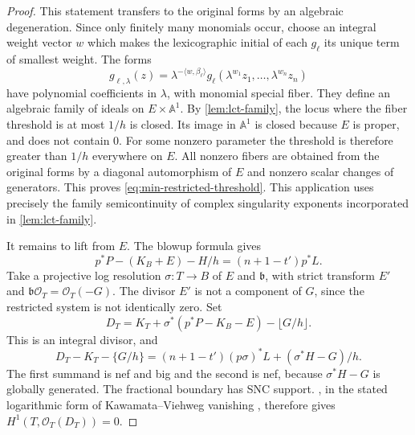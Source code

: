 \begin{proof}
This statement transfers to the original forms by an algebraic degeneration. Since only finitely many monomials occur, choose an integral weight vector $w$ which makes the lexicographic initial of each $g_\ell$ its unique term of smallest weight. The forms
\[
 g_{\ell,\lambda}(z)
   =\lambda^{-\langle w,\beta_\ell\rangle}
      g_\ell(\lambda^{w_1}z_1,\ldots,\lambda^{w_n}z_n)
\]
have polynomial coefficients in $\lambda$, with monomial special fiber. They define an algebraic family of ideals on $E\times\mathbb{A}^1$. By \cref{lem:lct-family}, the locus where the fiber threshold is at most $1/h$ is closed. Its image in $\mathbb{A}^1$ is closed because $E$ is proper, and does not contain $0$. For some nonzero parameter the threshold is therefore greater than $1/h$ everywhere on $E$. All nonzero fibers are obtained from the original forms by a diagonal automorphism of $E$ and nonzero scalar changes of generators. This proves \eqref{eq:min-restricted-threshold}. This application uses precisely the family semicontinuity of complex singularity exponents \cite{dk2001} incorporated in \cref{lem:lct-family}.

It remains to lift from $E$. The blowup formula gives
\begin{equation}
\label{eq:min-adjoint-identity}
 p^*P-(K_B+E)-H/h=(n+1-t')p^*L.
\end{equation}
Take a projective log resolution $\sigma:T\longrightarrow B$ of $E$ and $\mathfrak{b}$, with strict transform $E'$ and $\mathfrak{b}\mathcal{O}_T=\mathcal{O}_T(-G)$. The divisor $E'$ is not a component of $G$, since the restricted system is not identically zero. Set
\[
 D_T=K_T+\sigma^*(p^*P-K_B-E)-\lfloor G/h\rfloor.
\]
This is an integral divisor, and
\begin{equation}
\label{eq:min-preliminary-positivity}
 D_T-K_T-\{G/h\}
 =(n+1-t')(p\sigma)^*L+(\sigma^*H-G)/h.
\end{equation}
The first summand is nef and big and the second is nef, because $\sigma^*H-G$ is globally generated. The fractional boundary has SNC support. , in the stated logarithmic form of Kawamata--Viehweg vanishing \cite{fujinoKV}, therefore gives $H^1(T,\mathcal{O}_T(D_T))=0$.


\end{proof}
